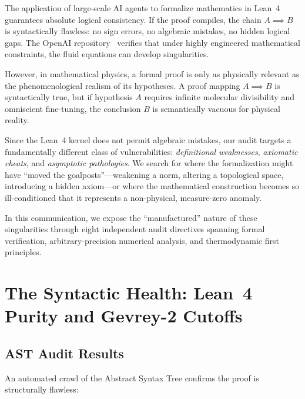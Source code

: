 \documentclass[11pt,a4paper]{article}
\begin{document}
The application of large-scale AI agents to formalize mathematics in Lean~4 guarantees absolute
logical consistency. If the proof compiles, the chain $A \implies B$ is syntactically flawless: no
sign errors, no algebraic mistakes, no hidden logical gaps. The OpenAI
repository~\cite{OpenAI2026} verifies that under highly engineered mathematical constraints, the
fluid equations can develop singularities.

However, in mathematical physics, a formal proof is only as physically relevant as the
phenomenological realism of its hypotheses. A proof mapping $A \implies B$ is syntactically true,
but if hypothesis $A$ requires infinite molecular divisibility and omniscient fine-tuning, the
conclusion $B$ is semantically vacuous for physical reality.

Since the Lean~4 kernel does not permit algebraic mistakes, our audit targets a fundamentally
different class of vulnerabilities: \emph{definitional weaknesses}, \emph{axiomatic cheats}, and
\emph{asymptotic pathologies}. We search for where the formalization might have ``moved the
goalposts''---weakening a norm, altering a topological space, introducing a hidden axiom---or
where the mathematical construction becomes so ill-conditioned that it represents a non-physical,
measure-zero anomaly.

In this communication, we expose the ``manufactured'' nature of these singularities through eight
independent audit directives spanning formal verification, arbitrary-precision numerical analysis,
and thermodynamic first principles.

\section{The Syntactic Health: Lean~4 Purity and Gevrey-2 Cutoffs}

\subsection{AST Audit Results}

An automated crawl of the Abstract Syntax Tree confirms the proof is structurally flawless:
\end{document}
